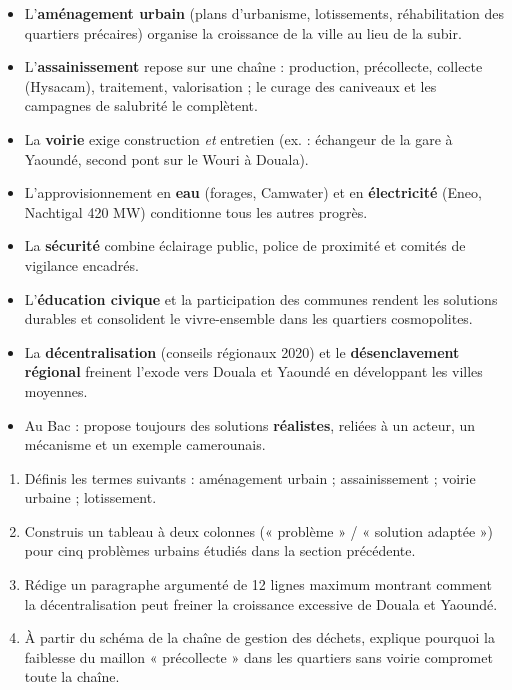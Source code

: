 \documentclass[11pt]{article}
\begin{document}
\begin{aretenir}
\begin{itemize}
\item L'\textbf{aménagement urbain} (plans d'urbanisme, lotissements, réhabilitation des quartiers précaires) organise la croissance de la ville au lieu de la subir.
\item L'\textbf{assainissement} repose sur une chaîne : production, précollecte, collecte (Hysacam), traitement, valorisation ; le curage des caniveaux et les campagnes de salubrité le complètent.
\item La \textbf{voirie} exige construction \emph{et} entretien (ex. : échangeur de la gare à Yaoundé, second pont sur le Wouri à Douala).
\item L'approvisionnement en \textbf{eau} (forages, Camwater) et en \textbf{électricité} (Eneo, Nachtigal \num{420} MW) conditionne tous les autres progrès.
\item La \textbf{sécurité} combine éclairage public, police de proximité et comités de vigilance encadrés.
\item L'\textbf{éducation civique} et la participation des communes rendent les solutions durables et consolident le vivre-ensemble dans les quartiers cosmopolites.
\item La \textbf{décentralisation} (conseils régionaux 2020) et le \textbf{désenclavement régional} freinent l'exode vers Douala et Yaoundé en développant les villes moyennes.
\item Au Bac : propose toujours des solutions \textbf{réalistes}, reliées à un acteur, un mécanisme et un exemple camerounais.
\end{itemize}
\end{aretenir}

\begin{exercice}
\begin{enumerate}
\item Définis les termes suivants : aménagement urbain ; assainissement ; voirie urbaine ; lotissement.
\item Construis un tableau à deux colonnes (« problème » / « solution adaptée ») pour cinq problèmes urbains étudiés dans la section précédente.
\item Rédige un paragraphe argumenté de 12 lignes maximum montrant comment la décentralisation peut freiner la croissance excessive de Douala et Yaoundé.
\item À partir du schéma de la chaîne de gestion des déchets, explique pourquoi la faiblesse du maillon « précollecte » dans les quartiers sans voirie compromet toute la chaîne.
\end{enumerate}
\end{exercice}
\end{document}
